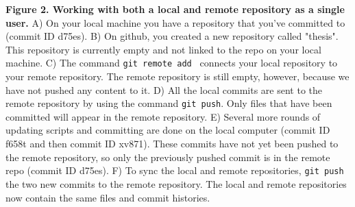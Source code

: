 \textbf{Figure 2. Working with both a local and remote repository as a single user.} A) On your local machine you have a repository that you've committed to (commit ID d75es). B) On github, you created a new repository called "thesis". This repository is currently empty and not linked to the repo on your local machine. C) The command \verb|git remote add | connects your local repository to your remote repository. The remote repository is still empty, however, because we have not pushed any content to it. D) All the local commits are sent to the remote repository by using the command \verb|git push|. Only files that have been committed will appear in the remote repository. E) Several more rounds of updating scripts and committing are done on the local computer (commit ID f658t and then commit ID xv871). These commits have not yet been pushed to the remote repository, so only the previously pushed commit is in the remote repo (commit ID d75es). F) To sync the local and remote repositories, \verb|git push| the two new commits to the remote repository. The local and remote repositories now contain the same files and commit histories. 